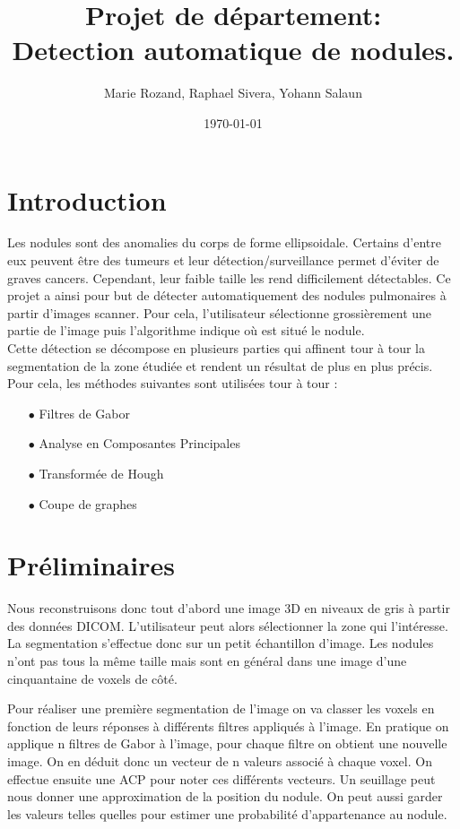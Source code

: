\documentclass{article}
\title{Projet de département: \\ Detection automatique de nodules.}
\author{Marie Rozand, Raphael Sivera, Yohann Salaun}
\date{\today}
\begin{document}
\maketitle

\section*{Introduction}

Les nodules sont des anomalies du corps de forme ellipsoidale. Certains d'entre eux peuvent être des tumeurs et leur détection/surveillance permet d'éviter de graves cancers. Cependant, leur faible taille les rend difficilement détectables. Ce projet a ainsi pour but de détecter automatiquement des nodules pulmonaires à partir d'images scanner. Pour cela, l'utilisateur sélectionne grossièrement une partie de l'image puis l'algorithme indique où est situé le nodule. \\
Cette détection se décompose en plusieurs parties qui affinent tour à tour la segmentation de la zone étudiée et rendent un résultat de plus en plus précis. Pour cela, les méthodes suivantes sont utilisées tour à tour :
\begin{itemize}
	\item[$\bullet$]Filtres de Gabor
	\item[$\bullet$]Analyse en Composantes Principales
	\item[$\bullet$]Transformée de Hough
	\item[$\bullet$]Coupe de graphes
\end{itemize}



\section{Préliminaires}

Nous reconstruisons donc tout d'abord une image 3D en niveaux de gris à partir des données DICOM. L'utilisateur peut alors sélectionner la zone qui l'intéresse. 
La segmentation s'effectue donc sur un petit échantillon d'image. Les nodules n'ont pas tous la même taille mais sont en général dans une image d'une cinquantaine de voxels de côté.

Pour réaliser une première segmentation de l'image on va classer les voxels en fonction de leurs réponses à différents filtres appliqués à l'image. En pratique on applique n filtres de Gabor à l'image, pour chaque filtre on obtient une nouvelle image. On en déduit donc un vecteur de n valeurs associé à chaque voxel. On effectue ensuite une ACP pour noter ces différents vecteurs.
Un seuillage peut nous donner une approximation de la position du nodule. On peut aussi garder les valeurs telles quelles pour estimer une probabilité d'appartenance au nodule.  
\end{document}
